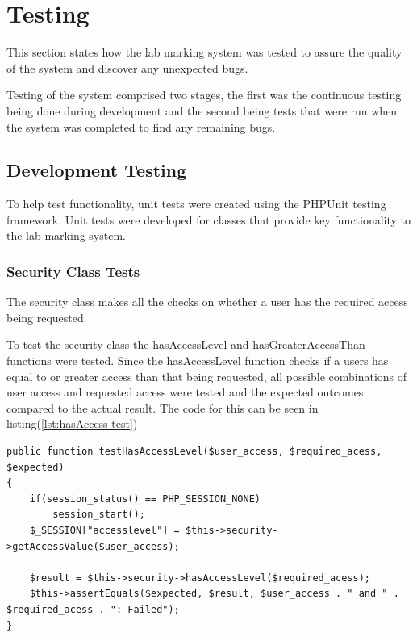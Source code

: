 \documentclass[12pt]{article}  %
\begin{document}
\newpage
\section{Testing}

This section states how the lab marking system was tested to assure the quality of the system and discover any unexpected bugs.

Testing of the system comprised two stages, the first was the continuous testing being done during development and the second being tests that were run when the system was completed to find any remaining bugs.


\subsection{Development Testing}
To help test functionality, unit tests were created using the PHPUnit testing framework. Unit tests were developed for classes that provide key functionality to the lab marking system. 

\subsubsection{Security Class Tests}

The security class makes all the checks on whether a user has the required access being requested. 

To test the security class  the hasAccessLevel and hasGreaterAccessThan functions were tested. Since the hasAccessLevel function checks if a users has equal to or greater access than that being requested, all possible combinations of user access and requested access were tested and the expected outcomes compared to the actual result. The code for this can be seen in listing(\ref{lst:hasAccess-test})

\singlespacing
\begin{lstlisting}[caption= hasAccessLevel Function Test, label = lst:hasAccess-test]
public function testHasAccessLevel($user_access, $required_acess, $expected)
{
    if(session_status() == PHP_SESSION_NONE)
        session_start();
    $_SESSION["accesslevel"] = $this->security->getAccessValue($user_access);

    $result = $this->security->hasAccessLevel($required_acess);
    $this->assertEquals($expected, $result, $user_access . " and " . $required_acess . ": Failed");
}
\end{lstlisting}
\doublespacing
\end{document}
